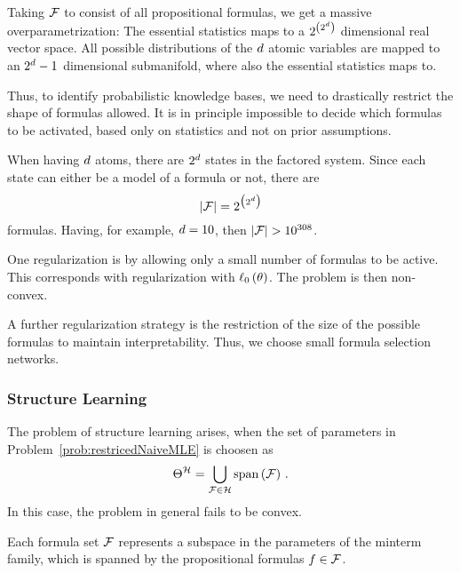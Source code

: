 \begin{remark}[Overparametrization]
	Taking $\mathcal{F}$ to consist of all propositional formulas, we get a massive overparametrization: 
	The essential statistics maps to a $2^{\left(2^d \right)}$ dimensional real vector space.
	All possible distributions of the $d$ atomic variables are mapped to an $2^d-1$ dimensional submanifold, where also the essential statistics maps to.

	Thus, to identify probabilistic knowledge bases, we need to drastically restrict the shape of formulas allowed.
	It is in principle impossible to decide which formulas to be activated, based only on statistics and not on prior assumptions.

	When having $d$ atoms, there are $2^{d}$ states in the factored system.
	Since each state can either be a model of a formula or not, there are
		\[ \left|\mathcal{F}\right| = 2^{\big(2^d \big)} \]
	formulas.
	Having, for example, $d=10$, then $\cardof{\formulaset}>10^{308}$.


One regularization is by allowing only a small number of formulas to be active.
This corresponds with regularization with $\ell_0\left(\theta\right)$.
The problem is then non-convex.


A further regularization strategy is the restriction of the size of the possible formulas to maintain interpretability. 
Thus, we choose small formula selection networks.
\end{remark}




\subsubsection{Structure Learning}

The problem of structure learning arises, when the set of parameters in Problem~\ref{prob:restricedNaiveMLE} is choosen as 
	\[ \Theta^{\mathcal{H}}= \bigcup_{\mathcal{F}\in\mathcal{H}} \mathrm{span}\left(\mathcal{F}\right) \, .  \] %
In this case, the problem in general fails to be convex.

Each formula set $\mathcal{F}$ represents a subspace in the parameters of the minterm family, which is spanned by the propositional formulas $f\in\mathcal{F}$.

